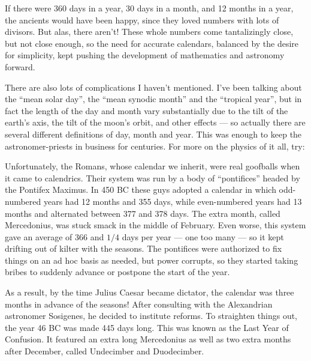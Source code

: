 \documentclass{article}
\def\tightlist{}
\renewcommand{\texttt}[1]{%
  \begingroup
  \ttfamily
  \begingroup\lccode`~=`/\lowercase{\endgroup\def~}{/\discretionary{}{}{}}%
  \begingroup\lccode`~=`[\lowercase{\endgroup\def~}{[\discretionary{}{}{}}%
  \begingroup\lccode`~=`.\lowercase{\endgroup\def~}{.\discretionary{}{}{}}%
  \catcode`/=\active\catcode`[=\active\catcode`.=\active
  \scantokens{#1\noexpand}%
  \endgroup
}
\begin{document}
If there were 360 days in a year, 30 days in a month, and 12 months in a
year, the ancients would have been happy, since they loved numbers with
lots of divisors. But alas, there aren't! These whole numbers come
tantalizingly close, but not close enough, so the need for accurate
calendars, balanced by the desire for simplicity, kept pushing the
development of mathematics and astronomy forward.

There are also lots of complications I haven't mentioned. I've been
talking about the ``mean solar day'', the ``mean synodic month'' and the
``tropical year'', but in fact the length of the day and month vary
substantially due to the tilt of the earth's axis, the tilt of the
moon's orbit, and other effects --- so actually there are several
different definitions of day, month and year. This was enough to keep
the astronomer-priests in business for centuries. For more on the
physics of it all, try:


Unfortunately, the Romans, whose calendar we inherit, were real
goofballs when it came to calendrics. Their system was run by a body of
``pontifices'' headed by the Pontifex Maximus. In 450 BC these guys
adopted a calendar in which odd-numbered years had 12 months and 355
days, while even-numbered years had 13 months and alternated between 377
and 378 days. The extra month, called Mercedonius, was stuck smack in
the middle of February. Even worse, this system gave an average of 366
and \(1/4\) days per year --- one too many --- so it kept drifting out
of kilter with the seasons. The pontifices were authorized to fix things
on an ad hoc basis as needed, but power corrupts, so they started taking
bribes to suddenly advance or postpone the start of the year.

As a result, by the time Julius Caesar became dictator, the calendar was
three months in advance of the seasons! After consulting with the
Alexandrian astronomer Sosigenes, he decided to institute reforms. To
straighten things out, the year 46 BC was made 445 days long. This was
known as the Last Year of Confusion. It featured an extra long
Mercedonius as well as two extra months after December, called
Undecimber and Duodecimber.
\end{document}
